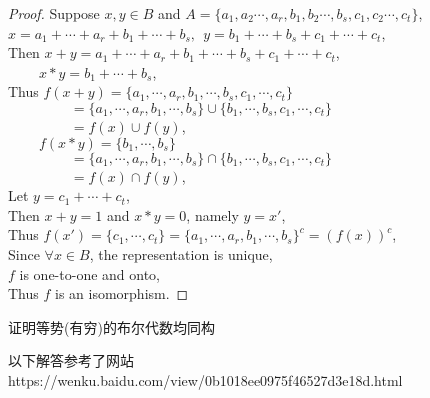\documentclass[11pt, a4paper, UTF8]{ctexart}
\begin{document}
\begin{proof}
  Suppose $x, y \in B$ and $A = \{ a_{1},a_{2}\cdots,a_{r},b_{1},b_{2}\cdots,b_{s},c_{1},c_{2}\cdots,c_{t} \}$,\\
  $x = a_{1} + \cdots + a_{r} + b_{1} + \cdots + b_{s},~~y = b_{1} + \cdots + b_{s} + c_{1} + \cdots + c_{t}$,\\
  Then $x + y = a_{1} + \cdots + a_{r} + b_{1} + \cdots + b_{s} + c_{1} + \cdots + c_{t}$,\\
  $~~~~~~~~~~x * y = b_{1} + \cdots + b_{s}$,\\
  Thus $f(x + y) = \{ a_{1},\cdots,a_{r},b_{1},\cdots,b_{s},c_{1},\cdots,c_{t} \}$\\
  $~~~~~~~~~~~~~~~~~~~~= \{ a_{1},\cdots,a_{r},b_{1},\cdots,b_{s} \} \cup \{ b_{1},\cdots,b_{s},c_{1},\cdots,c_{t} \}$\\
  $~~~~~~~~~~~~~~~~~~~~= f(x) \cup f(y)$,\\
  $~~~~~~~~~~f(x * y) = \{ b_{1},\cdots,b_{s} \}$\\
  $~~~~~~~~~~~~~~~~~~~~= \{ a_{1},\cdots,a_{r},b_{1},\cdots,b_{s} \} \cap \{ b_{1},\cdots,b_{s},c_{1},\cdots,c_{t} \}$\\
  $~~~~~~~~~~~~~~~~~~~~= f(x) \cap f(y)$,\\
  Let $y = c_{1} + \cdots + c_{t}$,\\
  Then $x + y = 1$ and $x * y = 0$, namely $y = x'$,\\
  Thus $f(x') = \{ c_{1},\cdots,c_{t} \} = \{ a_{1},\cdots,a_{r},b_{1},\cdots,b_{s} \}^{c} = (f(x))^{c}$,\\
  Since $\forall x \in B$, the representation is unique,\\
  $f$ is one-to-one and onto,\\
  Thus $f$ is an isomorphism.
\end{proof}
\begin{problem}
  证明等势(有穷)的布尔代数均同构
\end{problem}

 \begin{remark}	
   以下解答参考了网站https://wenku.baidu.com/view/0b1018ee0975f46527d3e18d.html
 \end{remark}
\end{document}
